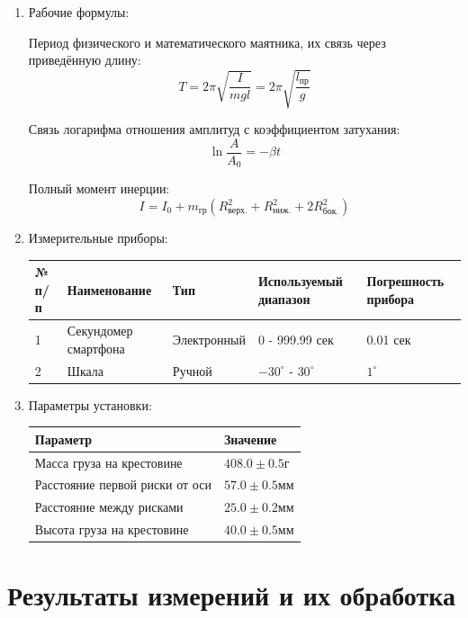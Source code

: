 \documentclass[12pt, a4paper]{article}
\begin{document}
\begin{enumerate}
\item Рабочие формулы:

Период физического и математического маятника, их связь через приведённую длину:
\begin{equation}
T = 2\pi\sqrt{\frac{I}{mgl}}=2\pi\sqrt{\frac{l_\text{пр}}{g}}
\end{equation}

Связь логарифма отношения амплитуд с коэффициентом затухания:
\begin{equation}
\ln\frac{A}{A_0} = -\beta t
\end{equation}


Полный момент инерции:
\begin{equation} \label{eq:1}
I = I_0 + m_{\text{гр}}\left(R_{\text{верх.}}^2  + R_{\text{ниж.}}^2 + 2R_{\text{бок.}}^2\right)
\end{equation}

\item Измерительные приборы:

\begin{table}[H]
\centering
\begin{tabular}{|l|l|l|l|l|}
\hline
№ п/п & Наименование & Тип & Используемый диапазон & Погрешность прибора\\
\hline
1 & Секундомер смартфона & Электронный & 0 - 999.99 сек  & 0.01 сек\\
\hline
2 & Шкала & Ручной & $-30^\circ$ - $30^\circ$ & $1^\circ$\\
\hline
\end{tabular}
\end{table}

\item Параметры установки:

\begin{table}[H]
\centering
\begin{tabular}{|l|l|}
\hline
Параметр & Значение\\
\hline
Масса груза на крестовине & $408.0 \pm 0.5$г\\
\hline
Расстояние первой риски от оси & $57.0 \pm 0.5$мм\\
\hline
Расстояние между рисками & $25.0 \pm 0.2$мм\\
\hline
Высота груза на крестовине & $40.0 \pm 0.5$мм\\
\hline
\end{tabular}
\end{table}

\end{enumerate}
\section{Результаты измерений и их обработка}
\end{document}
